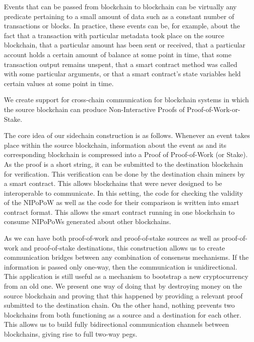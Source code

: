 Events that can be passed from blockchain to blockchain can be virtually any
predicate pertaining to a small amount of data such as a constant number of
transactions or blocks. In practice, these events can be, for example, about the
fact that a transaction with particular metadata took place on the source
blockchain, that a particular amount has been sent or received, that a
particular account holds a certain amount of balance at some point in time, that
some transaction output remains unspent, that a smart contract method was
called with some particular arguments, or that a smart contract's state
variables held certain values at some point in time.

We create support for cross-chain communication for blockchain systems in which
the source blockchain can produce Non-Interactive Proofs of
Proof-of-Work-or-Stake.

The core idea of our sidechain construction is as follows. Whenever an event
takes place within the source blockchain, information about the event as and its
corresponding blockchain is compressed into a Proof of Proof-of-Work (or Stake).
As the proof is a short string, it can be submitted to the destination
blockchain for verification. This verification can be done by the destination
chain miners by
a smart contract. This allows
blockchains that were never designed to be interoperable to communicate.
In this setting, the code for checking the validity of the NIPoPoW as well
as the code for their comparison is written into smart contract format.
This allows the smart contract running in one blockchain to consume NIPoPoWs
generated about other blockchains.

As we can have both proof-of-work and proof-of-stake sources as well as
proof-of-work and proof-of-stake destinations, this construction allows us to
create communication bridges between any combination of consensus mechanisms.
If the information is passed only one-way, then the communication is
unidirectional. This application is still useful as a mechanism to bootstrap a
new cryptocurrency from an old one. We present one way of doing that by
destroying money on the source blockchain and proving that this happened by
providing a relevant proof submitted to the destination chain. On the other
hand, nothing prevents two blockchains from both functioning as a source and a
destination for each other. This allows us to build fully bidirectional
communication channels between blockchains, giving rise to full two-way pegs.

